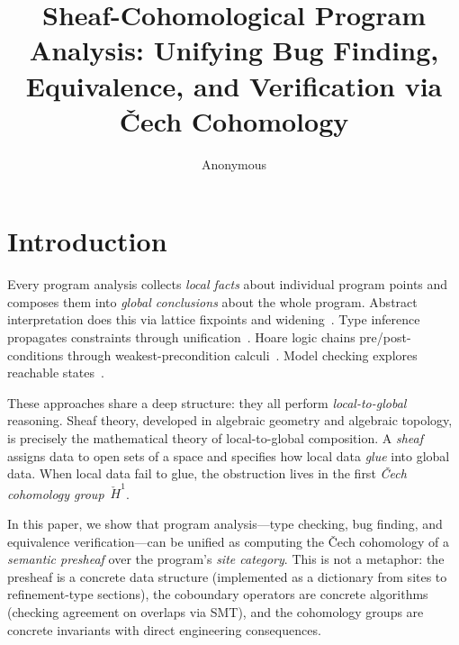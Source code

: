 \documentclass[acmsmall,screen,review,anonymous]{acmart}
\title{Sheaf-Cohomological Program Analysis:
  Unifying Bug Finding, Equivalence, and Verification
  via \v{C}ech Cohomology}
\author{Anonymous}
\affiliation{\institution{Anonymous Institution}}
\theoremstyle{remark}
\newcommand{\Hc}[1]{\check{H}^{#1}}
\begin{document}
\maketitle

\section{Introduction}\label{sec:intro}

Every program analysis collects \emph{local facts} about individual
program points and composes them into \emph{global conclusions} about
the whole program.  Abstract interpretation does this via lattice
fixpoints and widening~\cite{CousotCousot77}.  Type inference propagates
constraints through unification~\cite{HindleyMilner}.  Hoare logic
chains pre/post-conditions through weakest-precondition
calculi~\cite{Hoare69}.  Model checking explores reachable
states~\cite{ClarkeEmersonSistla86}.

These approaches share a deep structure: they all perform
\emph{local-to-global} reasoning.  Sheaf theory, developed in algebraic
geometry and algebraic topology, is precisely the mathematical theory of
local-to-global composition.  A \emph{sheaf} assigns data to open sets
of a space and specifies how local data \emph{glue} into global data.
When local data fail to glue, the obstruction lives in the first
\emph{\v{C}ech cohomology group}~$\Hc{1}$.

In this paper, we show that program analysis---type checking, bug
finding, and equivalence verification---can be unified as computing the
\v{C}ech cohomology of a \emph{semantic presheaf} over the program's
\emph{site category}.  This is not a metaphor: the presheaf is a
concrete data structure (implemented as a dictionary from sites to
refinement-type sections), the coboundary operators are concrete
algorithms (checking agreement on overlaps via SMT), and the cohomology
groups are concrete invariants with direct engineering consequences.
\end{document}
